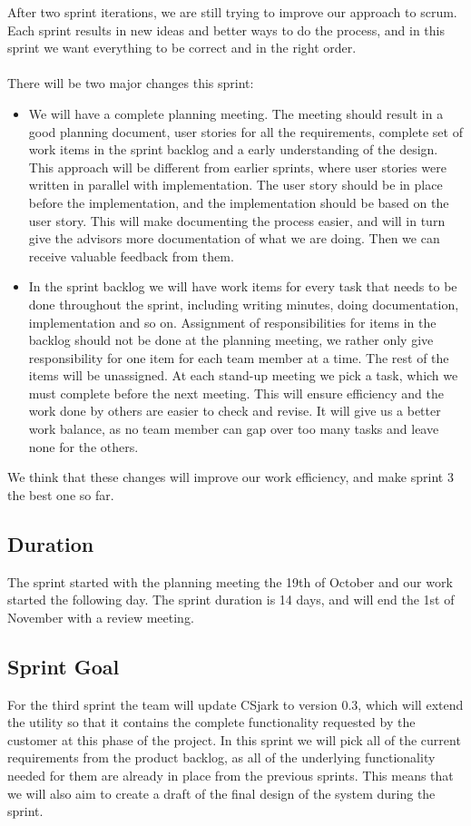 After two sprint iterations, we are still trying to improve our approach to \Gls{scrum}. Each sprint results in new ideas and better ways to do the process, and in this sprint we want everything to be correct and in the right order.\\
\\
There will be two major changes this sprint:
\begin {itemize}
\item We will have a complete planning meeting. The meeting should result in a good planning document, user stories for all the requirements, complete set of work items in the sprint backlog and a early understanding of the design. This approach will be different from earlier sprints, where user stories were written in parallel with implementation. The user story should be in place before the implementation, and the implementation should be based on the user story. This will make documenting the process easier, and will in turn give the advisors more documentation of what we are doing. Then we can receive valuable feedback from them.

\item In the sprint backlog we will have work items for every task that needs to be done throughout the sprint, including writing minutes, doing documentation, implementation and so on.  Assignment of responsibilities for items in the backlog should not be done at the planning meeting, we rather only give responsibility for one item for each team member at a time. The rest of the items will be unassigned. At each stand-up meeting we pick a task, which we must complete before the next meeting. This will ensure efficiency and the work done by others are easier to check and revise. It will give us a better work balance, as no team member can gap over too many tasks and leave none for the others.
\end{itemize}
We think that these changes will improve our work efficiency, and make sprint 3 the best one so far.

\subsection{Duration}
The sprint started with the planning meeting the 19th of October and our work started the following day. The sprint duration is 14 days, and will end the 1st of November with a review meeting. 

\subsection{Sprint Goal}
For the third sprint the team will update CSjark to version 0.3, which will extend the \gls{utility} so that it contains the complete functionality requested by the customer at this phase of the project. In this sprint we will pick all of the current requirements from the product backlog, as all of the underlying functionality needed for them are already in place from the previous sprints. This means that we will also aim to create a draft of the final design of the system during the sprint.

